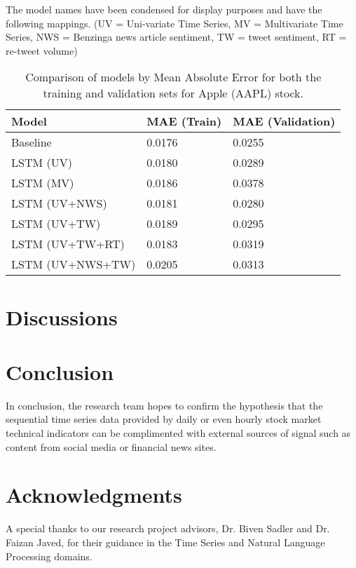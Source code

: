 \documentclass{llncs}
\begin{document}
The model names have been condensed for display purposes and have the following mappings.  (UV = Uni-variate Time Series, MV = Multivariate Time Series, NWS = Benzinga news article sentiment, TW = tweet sentiment, RT = re-tweet volume) 

\begin{table}[ht!]
    \centering
    \caption{Comparison of models by Mean Absolute Error for both the training and validation sets for Apple (AAPL) stock.}
    \begin{tabu}{*{3}{X[c]}}
    \toprule
        Model & MAE (Train) & MAE (Validation) \\
    \midrule
    Baseline & 0.0176 & 0.0255 \\
    LSTM (UV) & 0.0180 & 0.0289 \\
    LSTM (MV) & 0.0186 & 0.0378 \\
    LSTM (UV+NWS) & 0.0181 & 0.0280 \\
    LSTM (UV+TW) & 0.0189 & 0.0295 \\
    LSTM (UV+TW+RT) & 0.0183 & 0.0319 \\
    LSTM (UV+NWS+TW) & 0.0205 & 0.0313 \\
 
    \bottomrule
    \end{tabu}
 \label{tab:model_comparisons}
\end{table}


\section{Discussions}

\section{Conclusion}


In conclusion, the research team hopes to confirm the hypothesis that the sequential time series data provided by daily or even hourly stock market technical indicators can be complimented with external sources of signal such as content from social media or financial news sites.

\section{Acknowledgments}

A special thanks to our research project advisors, Dr. Biven Sadler and Dr. Faizan Javed, for their guidance in the Time Series and Natural Language Processing domains.
\end{document}
